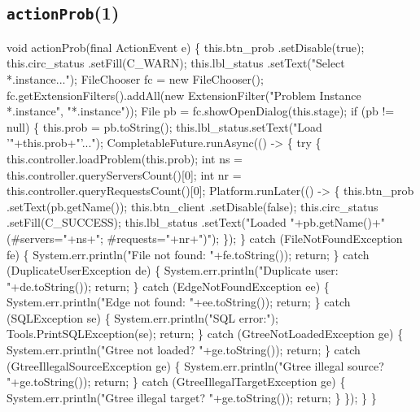 \subsection{\texttt{actionProb}(1)}
\nwenddocs{}\endmoddef{}
void actionProb(final ActionEvent e) \{
  this.btn_prob     .setDisable(true);
  this.circ_status  .setFill(C_WARN);
  this.lbl_status   .setText("Select *.instance...");
  FileChooser fc = new FileChooser();
  fc.getExtensionFilters().addAll(new ExtensionFilter("Problem Instance *.instance", "*.instance"));
  File pb = fc.showOpenDialog(this.stage);
  if (pb != null) \{
    this.prob = pb.toString();
    this.lbl_status.setText("Load '"+this.prob+"'...");
    CompletableFuture.runAsync(() -> \{
      try \{
        this.controller.loadProblem(this.prob);
        int ns = this.controller.queryServersCount()[0];
        int nr = this.controller.queryRequestsCount()[0];
        Platform.runLater(() -> \{
          this.btn_prob     .setText(pb.getName());
          this.btn_client   .setDisable(false);
          this.circ_status  .setFill(C_SUCCESS);
          this.lbl_status   .setText("Loaded "+pb.getName()+"(#servers="+ns+"; #requests="+nr+")");
        \});
      \} catch (FileNotFoundException fe) \{
        System.err.println("File not found: "+fe.toString());
        return;
      \} catch (DuplicateUserException de) \{
        System.err.println("Duplicate user: "+de.toString());
        return;
      \} catch (EdgeNotFoundException ee) \{
        System.err.println("Edge not found: "+ee.toString());
        return;
      \} catch (SQLException se) \{
        System.err.println("SQL error:");
        Tools.PrintSQLException(se);
        return;
      \} catch (GtreeNotLoadedException ge) \{
        System.err.println("Gtree not loaded? "+ge.toString());
        return;
      \} catch (GtreeIllegalSourceException ge) \{
        System.err.println("Gtree illegal source? "+ge.toString());
        return;
      \} catch (GtreeIllegalTargetException ge) \{
        System.err.println("Gtree illegal target? "+ge.toString());
        return;
      \}
    \});
  \}
\}
\nwendcode{}\nwdocspar

